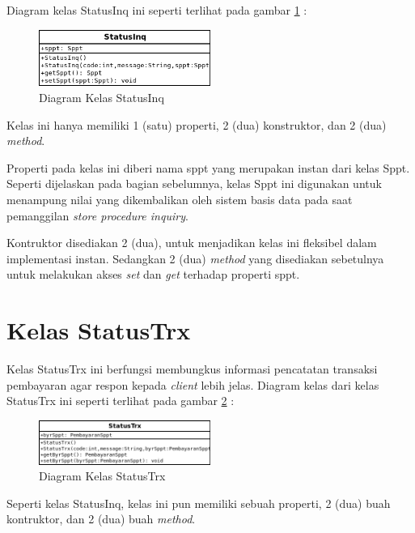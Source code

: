 Diagram kelas StatusInq ini seperti terlihat pada gambar \ref{fig:uml-class-StatusInq} :

\begin{figure}[H]
  \centering
  \includegraphics[width=0.5\textwidth]{./resources/uml/uml-class-StatusInq}
  \caption{Diagram Kelas StatusInq}
  \label{fig:uml-class-StatusInq}
\end{figure}

Kelas ini hanya memiliki 1 (satu) properti, 2 (dua) konstruktor, dan 2 (dua) \textit{method}.

Properti pada kelas ini diberi nama sppt yang merupakan instan dari kelas Sppt. Seperti dijelaskan pada bagian sebelumnya, kelas Sppt ini digunakan untuk menampung nilai yang dikembalikan oleh sistem basis data pada saat pemanggilan \textit{store procedure inquiry}.

Kontruktor disediakan 2 (dua), untuk menjadikan kelas ini fleksibel dalam implementasi instan. Sedangkan 2 (dua) \textit{method} yang disediakan sebetulnya untuk melakukan akses \textit{set} dan \textit{get} terhadap properti sppt.

\section{Kelas StatusTrx}

Kelas StatusTrx ini berfungsi membungkus informasi pencatatan transaksi pembayaran agar respon kepada \textit{client} lebih jelas. Diagram kelas dari kelas StatusTrx ini seperti terlihat pada gambar \ref{fig:uml-class-StatusTrx} :

\begin{figure}[H]
  \centering
  \includegraphics[width=0.5\textwidth]{./resources/uml/uml-class-StatusTrx}
  \caption{Diagram Kelas StatusTrx}
  \label{fig:uml-class-StatusTrx}
\end{figure}

Seperti kelas StatusInq, kelas ini pun memiliki sebuah properti, 2 (dua) buah kontruktor, dan 2 (dua) buah \textit{method}.

